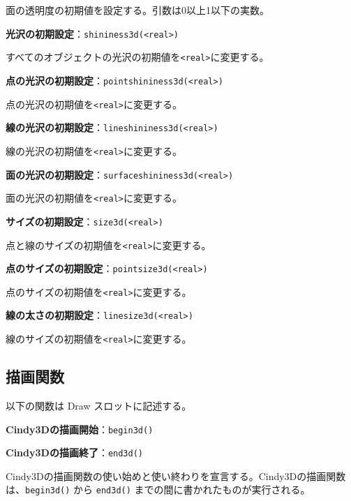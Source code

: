 \documentclass[papersize,a4paper,12pt,uplatex]{jsarticle}
\begin{document}
面の透明度の初期値を設定する。引数は0以上1以下の実数。

\vspace{\baselineskip}
\noindent
{\bf 光沢の初期設定}：\verb|shininess3d(<real>)|

すべてのオブジェクトの光沢の初期値を\verb|<real>|に変更する。

\vspace{\baselineskip}
\noindent
{\bf 点の光沢の初期設定}：\verb|pointshininess3d(<real>)|

点の光沢の初期値を\verb|<real>|に変更する。

\vspace{\baselineskip}
\noindent
{\bf 線の光沢の初期設定}：\verb|lineshininess3d(<real>)|

線の光沢の初期値を\verb|<real>|に変更する。

\vspace{\baselineskip}
\noindent
{\bf 面の光沢の初期設定}：\verb|surfaceshininess3d(<real>)|

面の光沢の初期値を\verb|<real>|に変更する。

\vspace{\baselineskip}
\noindent
{\bf サイズの初期設定}：\verb|size3d(<real>)|

点と線のサイズの初期値を\verb|<real>|に変更する。

\vspace{\baselineskip}
\noindent
{\bf 点のサイズの初期設定}：\verb|pointsize3d(<real>)|

点のサイズの初期値を\verb|<real>|に変更する。

\vspace{\baselineskip}
\noindent
{\bf 線の太さの初期設定}：\verb|linesize3d(<real>)|

線のサイズの初期値を\verb|<real>|に変更する。

\subsection{描画関数}

以下の関数は Draw スロットに記述する。

\noindent 
{\bf Cindy3Dの描画開始}：\verb|begin3d()|

\vspace{\baselineskip}
\noindent
{\bf Cindy3Dの描画終了}：\verb|end3d()|

Cindy3Dの描画関数の使い始めと使い終わりを宣言する。Cindy3Dの描画関数は、\verb|begin3d()| から \verb|end3d()| までの間に書かれたものが実行される。
\end{document}
